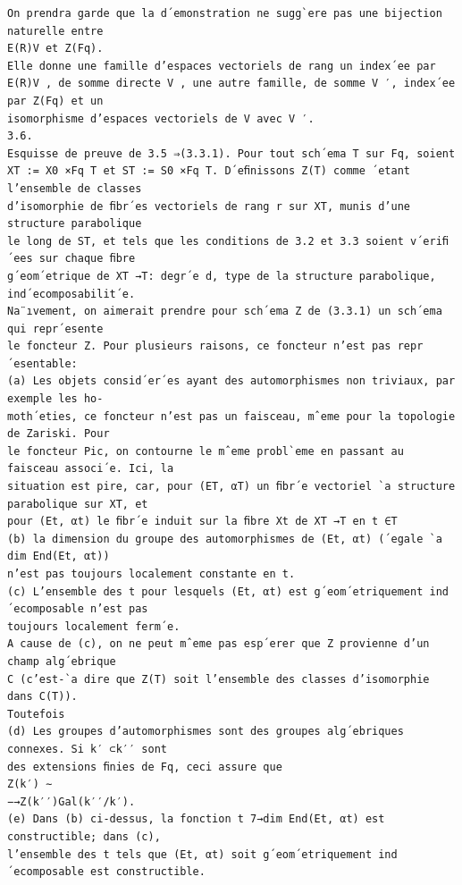 \documentclass[11pt]{article}
\begin{document}
\begin{Verbatim}[breaklines=true,fontsize=\small]
On prendra garde que la d´emonstration ne sugg`ere pas une bijection naturelle entre
E(R)V et Z(Fq).
Elle donne une famille d’espaces vectoriels de rang un index´ee par
E(R)V , de somme directe V , une autre famille, de somme V ′, index´ee par Z(Fq) et un
isomorphisme d’espaces vectoriels de V avec V ′.
3.6.
Esquisse de preuve de 3.5 ⇒(3.3.1). Pour tout sch´ema T sur Fq, soient
XT := X0 ×Fq T et ST := S0 ×Fq T. D´eﬁnissons Z(T) comme ´etant l’ensemble de classes
d’isomorphie de ﬁbr´es vectoriels de rang r sur XT, munis d’une structure parabolique
le long de ST, et tels que les conditions de 3.2 et 3.3 soient v´eriﬁ´ees sur chaque ﬁbre
g´eom´etrique de XT →T: degr´e d, type de la structure parabolique, ind´ecomposabilit´e.
Na¨ıvement, on aimerait prendre pour sch´ema Z de (3.3.1) un sch´ema qui repr´esente
le foncteur Z. Pour plusieurs raisons, ce foncteur n’est pas repr´esentable:
(a) Les objets consid´er´es ayant des automorphismes non triviaux, par exemple les ho-
moth´eties, ce foncteur n’est pas un faisceau, mˆeme pour la topologie de Zariski. Pour
le foncteur Pic, on contourne le mˆeme probl`eme en passant au faisceau associ´e. Ici, la
situation est pire, car, pour (ET, αT) un ﬁbr´e vectoriel `a structure parabolique sur XT, et
pour (Et, αt) le ﬁbr´e induit sur la ﬁbre Xt de XT →T en t ∈T
(b) la dimension du groupe des automorphismes de (Et, αt) (´egale `a dim End(Et, αt))
n’est pas toujours localement constante en t.
(c) L’ensemble des t pour lesquels (Et, αt) est g´eom´etriquement ind´ecomposable n’est pas
toujours localement ferm´e.
A cause de (c), on ne peut mˆeme pas esp´erer que Z provienne d’un champ alg´ebrique
C (c’est-`a dire que Z(T) soit l’ensemble des classes d’isomorphie dans C(T)).
Toutefois
(d) Les groupes d’automorphismes sont des groupes alg´ebriques connexes. Si k′ ⊂k′′ sont
des extensions ﬁnies de Fq, ceci assure que
Z(k′) ∼
−→Z(k′′)Gal(k′′/k′).
(e) Dans (b) ci-dessus, la fonction t 7→dim End(Et, αt) est constructible; dans (c),
l’ensemble des t tels que (Et, αt) soit g´eom´etriquement ind´ecomposable est constructible.


\end{Verbatim}
\end{document}
